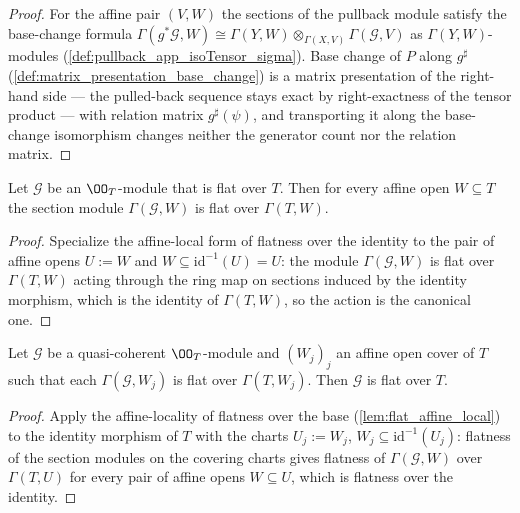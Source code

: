\begin{proof}
  \leanok
  For the affine pair \((V, W)\) the sections of the pullback module satisfy
  the base-change formula
  \(\Gamma(g^*\mathcal G, W) \cong
    \Gamma(Y, W) \otimes_{\Gamma(X, V)} \Gamma(\mathcal G, V)\)
  as \(\Gamma(Y, W)\)-modules (\cref{def:pullback_app_isoTensor_sigma}).
  Base change of \(P\) along \(g^\sharp\)
  (\cref{def:matrix_presentation_base_change}) is a matrix presentation of
  the right-hand side --- the pulled-back sequence stays exact by
  right-exactness of the tensor product --- with relation matrix
  \(g^\sharp(\psi)\), and transporting it along the base-change isomorphism
  changes neither the generator count nor the relation matrix.
\end{proof}

\begin{lemma}
  \label{lem:flat_sections_of_sheaf_flat}
  \leanok
  Let \(\mathcal G\) be an \(\OO_T\)-module that is flat over \(T\).  Then
  for every affine open \(W \subseteq T\) the section module
  \(\Gamma(\mathcal G, W)\) is flat over \(\Gamma(T, W)\).
\end{lemma}

\begin{proof}
  \leanok
  Specialize the affine-local form of flatness over the identity to the pair
  of affine opens \(U := W\) and \(W \subseteq \mathrm{id}^{-1}(U) = U\):
  the module \(\Gamma(\mathcal G, W)\) is flat over \(\Gamma(T, W)\) acting
  through the ring map on sections induced by the identity morphism, which
  is the identity of \(\Gamma(T, W)\), so the action is the canonical one.
\end{proof}

\begin{lemma}
  \label{lem:sheaf_flat_of_flat_charts}
  \leanok
  Let \(\mathcal G\) be a quasi-coherent \(\OO_T\)-module and \((W_j)_j\) an
  affine open cover of \(T\) such that each \(\Gamma(\mathcal G, W_j)\) is
  flat over \(\Gamma(T, W_j)\).  Then \(\mathcal G\) is flat over \(T\).
\end{lemma}

\begin{proof}
  \leanok
  Apply the affine-locality of flatness over the base
  (\cref{lem:flat_affine_local}) to the identity morphism of \(T\) with the
  charts \(U_j := W_j\), \(W_j \subseteq \mathrm{id}^{-1}(U_j)\): flatness
  of the section modules on the covering charts gives flatness of
  \(\Gamma(\mathcal G, W)\) over \(\Gamma(T, U)\) for every pair of affine
  opens \(W \subseteq U\), which is flatness over the identity.
\end{proof}

